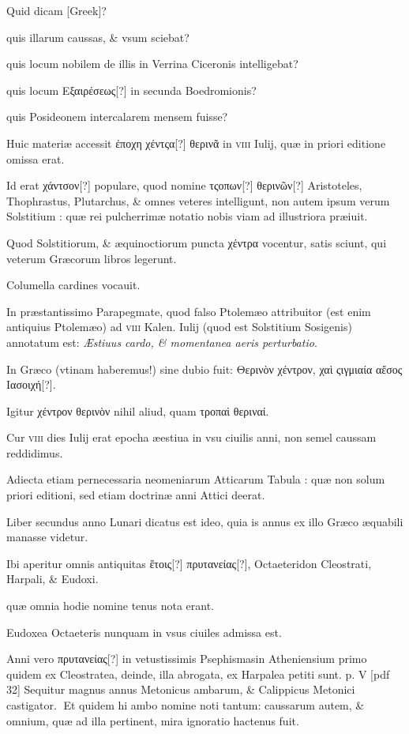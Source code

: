 \begin{parnumbers}
Quid dicam \textgreek{[Greek]}?

quis illarum caussas, \& vsum sciebat?

quis locum nobilem de illis in Verrina Ciceronis intelligebat?

quis locum \textgreek{Εξαιρέσεως[?]} in secunda Boedromionis?

quis Posideonem intercalarem mensem fuisse?

Huic materiæ accessit \textgreek{ἐποχη χέντςα[?] θερινᾶ} in \textsc{viii} Iulij, quæ in priori editione omissa erat.

Id erat \textgreek{χάντσον[?]} populare, quod nomine \textgreek{τςοπων[?] θερινῶν[?]} Aristoteles, Thophrastus, Plutarchus, \& omnes veteres intelligunt, non autem ipsum verum Solstitium : quæ rei pulcherrimæ notatio nobis viam ad illustriora præiuit.

Quod Solstitiorum, \& æquinoctiorum puncta \textgreek{χέντρα} vocentur, satis sciunt, qui veterum Græcorum libros legerunt.

Columella cardines vocauit.

In præstantissimo Parapegmate, quod falso Ptolemæo attribuitor (est enim antiquius Ptolemæo) ad \textsc{viii} Kalen. Iulij (quod est Solstitium Sosigenis) annotatum est: \textit{Æstiuus cardo, \& momentanea aeris perturbatio}.

In Græco (vtinam haberemus!) sine dubio fuit: \textgreek{Θερινὸν χέντρον, χαὶ ςιγμιαία αἔσος Ιασοιχή[?]}.

Igitur \textgreek{χέντρον θερινὸν} nihil aliud, quam \textgreek{τροπαὶ θεριναί}.

Cur \textsc{viii} dies Iulij erat epocha æestiua in vsu ciuilis anni, non semel caussam reddidimus. 

Adiecta etiam pernecessaria neomeniarum Atticarum Tabula : quæ non solum priori editioni, sed etiam doctrinæ anni Attici deerat.

Liber secundus anno Lunari dicatus est ideo, quia is annus ex illo Græco æquabili manasse videtur.

Ibi aperitur omnis antiquitas \textgreek{ἔτοις[?] πρυτανείας[?]}, Octaeteridon Cleostrati, Harpali, \& Eudoxi.

quæ omnia hodie nomine tenus nota erant.

Eudoxea Octaeteris nunquam in vsus ciuiles admissa est.

Anni vero \textgreek{πρυτανείας[?]} in vetustissimis Psephismasin Atheniensium primo quidem ex Cleostratea, deinde, illa abrogata, ex Harpalea petiti sunt.
\clearpage
p. V [pdf 32]
Sequitur magnus annus Metonicus
ambarum, \& Calippicus Metonici castigator.
Et quidem hi ambo nomine noti tantum: caussarum autem, \& omnium, quæ ad illa pertinent, mira ignoratio hactenus fuit.


\end{parnumbers}

